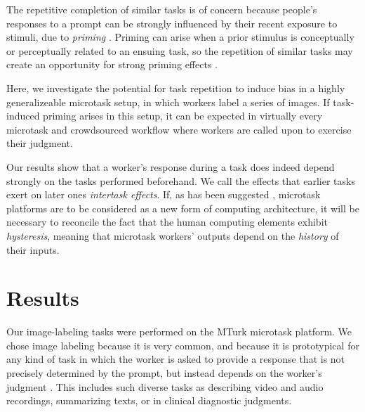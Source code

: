 \documentclass{pnastwo}
\begin{document}
\begin{article}
The repetitive completion of similar tasks is of concern because people's 
responses to a prompt can be strongly influenced by their recent exposure to 
stimuli, due to \textit{priming} 
\cite{BJOP1796}. %
Priming can arise when 
a prior stimulus is conceptually or perceptually related to an ensuing 
task, so the repetition of 
similar tasks may create an opportunity for strong priming effects
\cite{Gass1999549}. %


Here, we investigate the potential for task repetition to induce bias in 
a highly generalizeable microtask setup, in which workers label a 
series of images.  If task-induced priming arises in this setup, 
it can be expected in virtually every microtask and crowdsourced workflow
where workers are called upon to exercise their judgment.

Our results show that a worker's response during a task
does indeed depend strongly on the tasks performed beforehand.   
We call the effects that earlier tasks exert on later ones 
\textit{intertask effects}.  If, as has been suggested \cite{5543192}, 
microtask platforms are to be considered as a new form of computing 
architecture, it will be necessary to reconcile the fact that the human 
computing elements 
exhibit \textit{hysteresis}, meaning that microtask workers' outputs depend 
on the \textit{history} of their inputs.

\section{Results}

Our image-labeling tasks were performed on the MTurk microtask platform.  We
chose image labeling because it is very common,
and because it is prototypical for any kind of task in which the worker is
asked to provide a response that is not precisely determined by the prompt, but
instead depends on the worker's judgment
\cite{chandler2013breaking,Finnerty2013}.  This includes such diverse tasks as
describing video and audio recordings, summarizing texts, or in clinical
diagnostic judgments.


\end{article}
\end{document}
